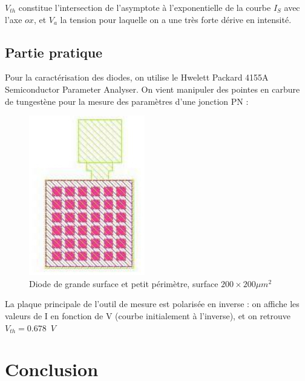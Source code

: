 \documentclass[11pt]{article}
\begin{document}
$V_{th}$ constitue l'intersection de l'asymptote \`a l'exponentielle de la courbe $I_{S}$ avec l'axe $ox$, et $V_{a}$ la tension pour laquelle on a une tr\`es forte d\'erive en intensit\'e.

\subsection{Partie pratique}
Pour la caract\'erisation des diodes, on utilise le Hwelett Packard 4155A Semiconductor Parameter Analyser. On vient manipuler des pointes en carbure de tungest\`ene pour la mesure des param\`etres d'une jonction PN :

\begin{figure}[!htb]
\centering
\includegraphics[scale=0.54]{diode_junction.jpg}
\caption{Diode de grande surface et petit p\'erim\`etre, surface $200 \times 200 \mu m^{2}$}
\end{figure}

La plaque principale de l'outil de mesure est polaris\'ee en inverse : on affiche les valeurs de I en fonction de V (courbe initialement \`a l'inverse), et on retrouve $V_{th} = 0.678 \phantom{2} V$ 


\section{Conclusion}
\end{document}
